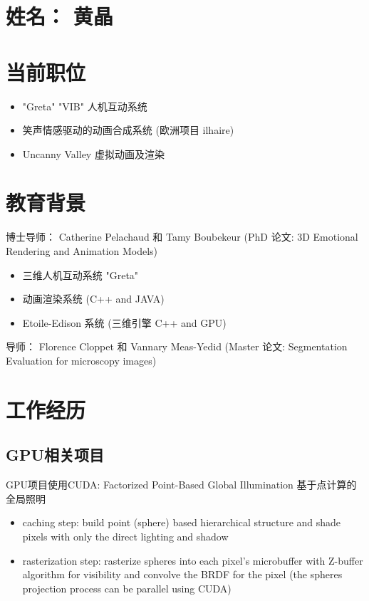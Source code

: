 \section{姓名： 黄晶}
\section{当前职位}
{
\begin{itemize}
	\item "Greta" "VIB" 人机互动系统
	\item 笑声情感驱动的动画合成系统 (欧洲项目 ilhaire)
	\item Uncanny Valley 虚拟动画及渲染
\end{itemize}
}


\section{教育背景}
{博士导师： Catherine Pelachaud 和 Tamy Boubekeur (PhD 论文: 3D Emotional Rendering and Animation Models)
\begin{itemize}
	\item 三维人机互动系统 "Greta"
	\item 动画渲染系统 (C++ and JAVA)
	\item Etoile-Edison 系统 (三维引擎 C++ and GPU)
\end{itemize}
}  %

{导师： Florence Cloppet 和 Vannary Meas-Yedid (Master 论文: Segmentation Evaluation for microscopy images)
}


\section{工作经历}

\subsection{GPU相关项目}
{
GPU项目使用CUDA: Factorized Point-Based Global Illumination  基于点计算的全局照明
\begin{itemize}
	\item caching step: build point (sphere) based hierarchical structure and shade pixels with only the direct lighting and shadow
	\item rasterization step: rasterize spheres into each pixel's microbuffer with Z-buffer algorithm for visibility and convolve the BRDF for the pixel (the spheres projection process can be parallel using CUDA)
\end{itemize}
}

